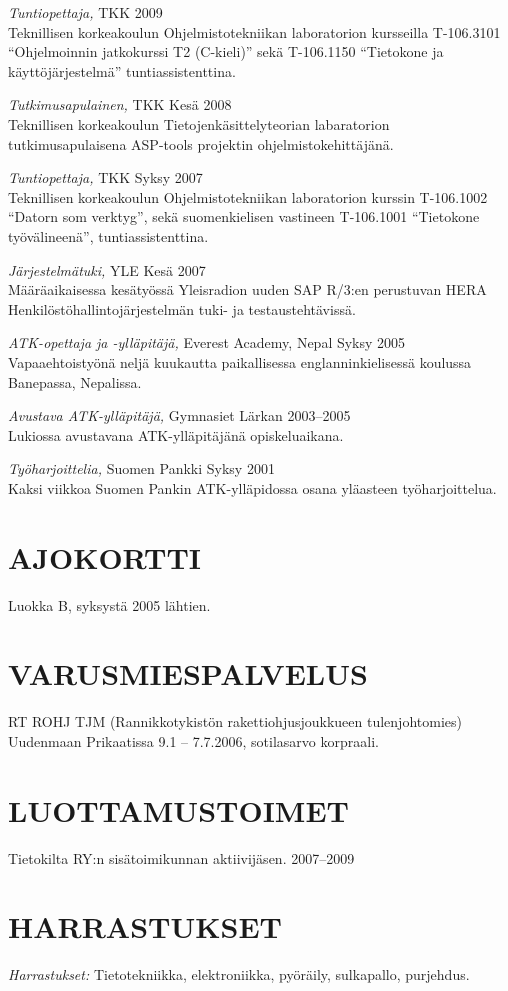 \documentclass[line,margin]{res}
\begin{document}
\begin{resume}
		{\sl Tuntiopettaja,} TKK 	\hfill 2009 \\
			Teknillisen korkeakoulun Ohjelmistotekniikan laboratorion kursseilla T-106.3101 ``Ohjelmoinnin jatkokurssi T2 (C-kieli)'' sekä T-106.1150 ``Tietokone ja käyttöjärjestelmä'' tunti\-assistenttina.
		
		{\sl Tutkimusapulainen,} TKK 	\hfill Kesä 2008 \\
			Teknillisen korkeakoulun Tietojenkäsittelyteorian labaratorion tutkimusapulaisena 				ASP-tools projektin ohjelmistokehittäjänä.
				
		{\sl Tuntiopettaja,} TKK 	\hfill Syksy 2007 \\
			Teknillisen korkeakoulun Ohjelmistotekniikan laboratorion kurssin T-106.1002 
			``Datorn som verktyg'', sekä suomen\-kielisen vastineen T-106.1001 
			``Tieto\-kone työ\-välineenä'', tunti\-assistenttina.

		{\sl Järjestelmätuki, } YLE 	\hfill Kesä 2007 \\
			Määräaikaisessa kesätyössä Yleisradion uuden SAP R/3:en perustuvan HERA 
			Henkilöstö\-hallinto\-järjestelmän tuki- ja testaustehtävissä.
			
		{\sl ATK-opettaja ja -ylläpitäjä, } Everest Academy, Nepal \hfill Syksy 2005 \\
			Vapaaehtoistyönä neljä kuukautta paikallisessa englanninkielisessä koulussa Banepassa, Nepalissa.

		{\sl Avustava ATK-ylläpitäjä, } Gymnasiet Lärkan \hfill 2003--2005 \\
			Lukiossa avustavana ATK-ylläpitäjänä opiskeluaikana.

		{\sl Työharjoittelia, } Suomen Pankki	\hfill Syksy 2001 \\
			Kaksi viikkoa Suomen Pankin ATK-ylläpidossa osana yläasteen työharjoittelua.

\pagebreak
\section{AJOKORTTI}Luokka  B, syksystä 2005 lähtien.

 
\section{VARUSMIES\-PALVELUS}  
		RT ROHJ TJM (Rannikkotykistön rakettiohjusjoukkueen tulenjohtomies) \\ 
		Uudenmaan Prikaatissa 9.1 -- 7.7.2006, sotilasarvo korpraali.


\section{LUOTTAMUS\-TOIMET}             
            Tietokilta RY:n sisätoimikunnan aktiivijäsen. \hfill 2007--2009
            
\section{HARRASTUKSET}
            {\sl Harrastukset: } Tietotekniikka, elektroniikka, pyöräily, sulkapallo, purjehdus.

\end{resume}
\end{document}
